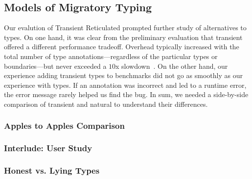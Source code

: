 \subsection{Models of Migratory Typing}

Our evalution of Transient Reticulated prompted further study of alternatives
 to \tdeep{} types.
On one hand, it was clear from the preliminary evaluation that transient offered
 a different performance tradeoff.
Overhead typically increased with the total number of type annotations---regardless
 of the particular types or boundaries---but never exceeded a $10$x
 slowdown~\cite{gm-pepm-2018}.
On the other hand, our experience adding transient types to benchmarks
 did not go as smoothly as our experience with \tdeep{} types.
If an annotation was incorrect and led to a runtime error, the error message
 rarely helped us find the bug.
In sum, we needed a side-by-side comparison of transient and natural to
 understand their differences.



\subsubsection{Apples to Apples Comparison}

\subsubsection{Interlude: User Study}


\subsubsection{Honest vs. Lying Types}

